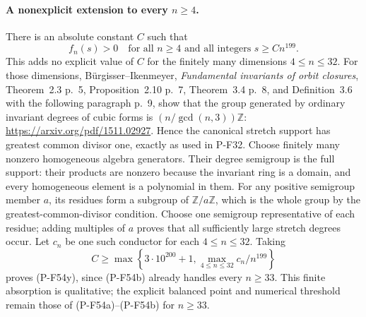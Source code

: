 \paragraph{A nonexplicit extension to every $n\ge4$.}
There is an absolute constant $C$ such that
\[
                f_n(s)>0\quad
       \text{for all }n\ge4\text{ and all integers }s\ge Cn^{199}.
                                                               \tag{P-F54y}
\]
This adds no explicit value of $C$ for the finitely many
dimensions $4\le n\le32$.
For those dimensions, B\"urgisser--Ikenmeyer,
\emph{Fundamental invariants of orbit closures},
Theorem~2.3 p.~5, Proposition~2.10 p.~7, Theorem~3.4 p.~8,
and Definition~3.6 with the following paragraph p.~9,
show that the group generated by ordinary invariant
degrees of cubic forms is $(n/\gcd(n,3))\mathbb Z$:
\url{https://arxiv.org/pdf/1511.02927}.
Hence the canonical stretch support has greatest common
divisor one, exactly as used in P-F32.
Choose finitely many nonzero homogeneous algebra generators.
Their degree semigroup is the full support: their products
are nonzero because the invariant ring is a domain, and
every homogeneous element is a polynomial in them.
For any positive semigroup member $a$, its residues form
a subgroup of $\mathbb Z/a\mathbb Z$, which is the whole
group by the greatest-common-divisor condition.
Choose one semigroup representative of each residue;
adding multiples of $a$ proves that all sufficiently
large stretch degrees occur. Let $c_n$ be one such
conductor for each $4\le n\le32$.
Taking
\[
 C\ge\max\left\{3\cdot10^{200}+1,
             \max_{4\le n\le32}c_n/n^{199}\right\}
\]
proves (P-F54y), since (P-F54b) already handles every
$n\ge33$. This finite absorption is qualitative; the
explicit balanced point and numerical threshold remain
those of (P-F54a)--(P-F54b) for $n\ge33$.

